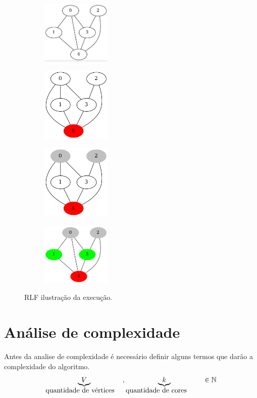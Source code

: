 \documentclass[12pt]{article}
\begin{document}
\begin{center}
\begin{figure}
\begin{subfigure}[b]{.5\linewidth}
\centering
\includegraphics[width=3.3cm]{RLFFuncionamento1}
\end{subfigure}
\begin{subfigure}[b]{.5\linewidth}
\centering
\includegraphics[width=3.3cm]{RLFFuncionamento2}
\end{subfigure}
\begin{subfigure}[b]{.5\linewidth}
\centering
\includegraphics[width=3.3cm]{RLFFuncionamento3}
\end{subfigure}
\begin{subfigure}[b]{.5\linewidth}
\centering
\includegraphics[width=3.3cm]{RLFFuncionamento4}
\end{subfigure}
\caption{RLF ilustração da execução.}\label{fig:rlffuncionamento}
\end{figure}
\end{center}

\section{Análise de complexidade}
\label{sec:org88daed8}
Antes da analise de complexidade é necessário definir alguns termos que darão a complexidade do algoritmo.
\begin{equation}
\underbrace{V}_{\parbox{3.85cm}{quantidade de vértices}}, \underbrace{k}_{\parbox{3.85cm}{quantidade de cores}} \in \mathbb{N}\\
\end{equation}
\end{document}
